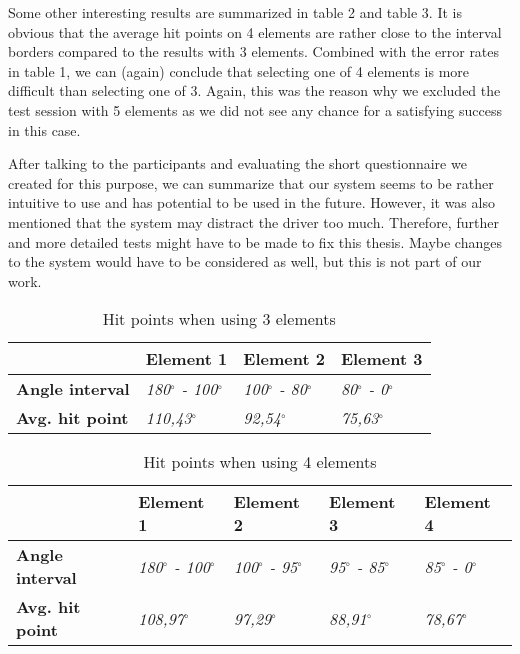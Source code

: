 \documentclass{sigchi-ext}
\begin{document}
Some other interesting results are summarized in table 2 and table 3. It is obvious that the average hit points on 4 elements are rather close to the interval borders compared to the results with 3 elements. Combined with the error rates in table 1, we can (again) conclude that selecting one of 4 elements is more difficult than selecting one of 3. Again, this was the reason why we excluded the test session with 5 elements as we did not see any chance for a satisfying success in this case.

After talking to the participants and evaluating the short questionnaire we created for this purpose, we can summarize that our system seems to be rather intuitive to use and has potential to be used in the future. However, it was also mentioned that the system may distract the driver too much. Therefore, further and more detailed tests might have to be made to fix this thesis. Maybe changes to the system would have to be considered as well, but this is not part of our work.

\begin{table}
\begin{tabular}{|l|l|l|l|}
\hline
  & \textbf{Element 1} & \textbf{Element 2} & \textbf{Element 3} \\
\hline
\textbf{Angle interval} & \textit{180$^\circ$ - 100$^\circ$} & \textit{100$^\circ$ - 80$^\circ$} & \textit{80$^\circ$ - 0$^\circ$} \\
\hline
\textbf{Avg. hit point} & \textit{110,43$^\circ$} & \textit{92,54$^\circ$} & \textit{75,63$^\circ$} \\
\hline
\end{tabular}
\caption{Hit points when using 3 elements}
\end{table}

\begin{table}
\begin{tabular}{|l|l|l|l|l|}
\hline
  & \textbf{Element 1} & \textbf{Element 2} & \textbf{Element 3} & \textbf{Element 4} \\
\hline
\textbf{Angle interval} & \textit{180$^\circ$ - 100$^\circ$} & \textit{100$^\circ$ - 95$^\circ$} & \textit{95$^\circ$ - 85$^\circ$} & \textit{85$^\circ$ - 0$^\circ$} \\
\hline
\textbf{Avg. hit point} & \textit{108,97$^\circ$} & \textit{97,29$^\circ$} & \textit{88,91$^\circ$} & \textit{78,67$^\circ$} \\
\hline
\end{tabular}
\caption{Hit points when using 4 elements}
\end{table}
\end{document}
